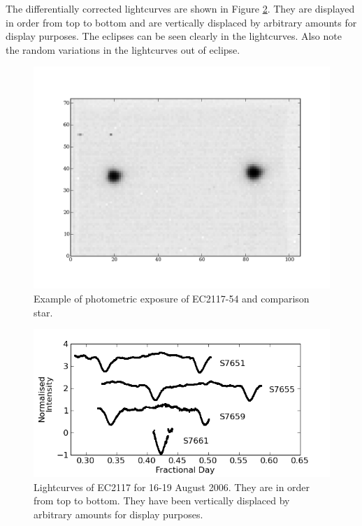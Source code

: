 The differentially corrected lightcurves are shown in Figure \ref{lightcurves}. They are displayed in order from top to bottom and are vertically displaced by arbitrary amounts for display purposes. The eclipses can be seen clearly in the lightcurves. Also note the random variations in the lightcurves out of eclipse.

\begin{figure}
\begin{center}
\includegraphics[bb=0 0 600 400,width=0.85\columnwidth]{images/inv_exposure.png}
\caption[Example of photometric exposure]{Example of photometric exposure of EC2117-54 and comparison star.}
\label{exposure} 
\end{center}
\end{figure}


\begin{figure}
\begin{center}
\includegraphics[bb=0 0 600 400,width=0.85\columnwidth]{images/lightcurves.png}
\caption[Lightcurves of EC2117 for 16-19 August 2006.]{Lightcurves of EC2117 for 16-19 August 2006. They are in order from top to bottom. They have been vertically displaced by arbitrary amounts for display purposes.}
\label{lightcurves}
\end{center}
\end{figure}


